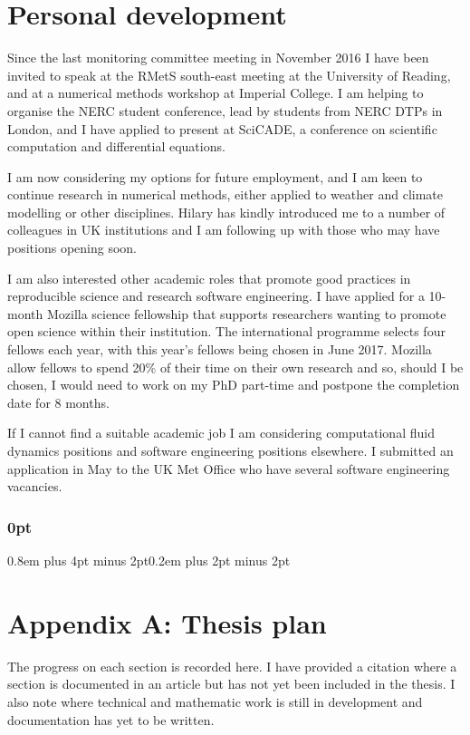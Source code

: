 \documentclass[a4paper,11pt]{article}
\begin{document}
\section{Personal development}

Since the last monitoring committee meeting in November 2016 I have been invited to speak at the RMetS south-east meeting at the University of Reading, and at a numerical methods workshop at Imperial College.  I am helping to organise the NERC student conference, lead by students from NERC DTPs in London, and I have applied to present at SciCADE, a conference on scientific computation and differential equations.

I am now considering my options for future employment, and I am keen to continue research in numerical methods, either applied to weather and climate modelling or other disciplines.
Hilary has kindly introduced me to a number of colleagues in UK institutions and I am following up with those who may have positions opening soon.

I am also interested other academic roles that promote good practices in reproducible science and research software engineering.
I have applied for a 10-month Mozilla science fellowship that supports researchers wanting to promote open science within their institution.
The international programme selects four fellows each year, with this year's fellows being chosen in June 2017.
Mozilla allow fellows to spend 20\% of their time on their own research and so, should I be chosen, I would need to work on my PhD part-time and postpone the completion date for 8 months.

If I cannot find a suitable academic job I am considering computational fluid dynamics positions and software engineering positions elsewhere.
I submitted an application in May to the UK Met Office who have several software engineering vacancies.


                                                 


\newpage

\titlespacing\subsubsection{0pt}{0.8em plus 4pt minus 2pt}{0.2em plus 2pt minus 2pt}

\section*{Appendix A: Thesis plan}
\footnotesize
The progress on each section is recorded here.  I have provided a citation where a section is documented in an article but has not yet been included in the thesis.  I also note where technical and mathematic work is still in development and documentation has yet to be written.
\end{document}
